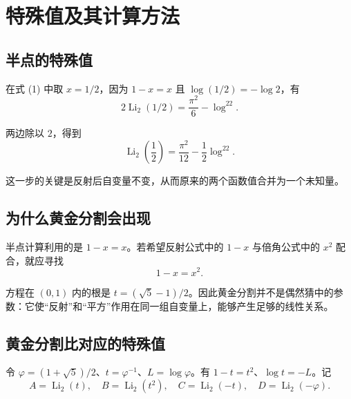 \documentclass[11pt,a4paper]{article}
\begin{document}
\hypertarget{ux7279ux6b8aux503cux53caux5176ux8ba1ux7b97ux65b9ux6cd5}{%
\section{特殊值及其计算方法}\label{ux7279ux6b8aux503cux53caux5176ux8ba1ux7b97ux65b9ux6cd5}}

\hypertarget{ux534aux70b9ux7684ux7279ux6b8aux503c}{%
\subsection{半点的特殊值}\label{ux534aux70b9ux7684ux7279ux6b8aux503c}}

在式 (1) 中取 \(x=1/2\)，因为 \(1-x=x\) 且 \(\log(1/2)=-\log2\)，有
\[
2\operatorname{Li}_2(1/2)=\frac{\pi^2}{6}-\log^22.
\]

两边除以 \(2\)，得到
\begin{equation}
\operatorname{Li}_2\!\left(\frac12\right)
=\frac{\pi^2}{12}-\frac12\log^22.
\tag{5}
\end{equation}

这一步的关键是反射后自变量不变，从而原来的两个函数值合并为一个未知量。

\hypertarget{ux4e3aux4ec0ux4e48ux9ec4ux91d1ux5206ux5272ux4f1aux51faux73b0}{%
\subsection{为什么黄金分割会出现}\label{ux4e3aux4ec0ux4e48ux9ec4ux91d1ux5206ux5272ux4f1aux51faux73b0}}

半点计算利用的是 \(1-x=x\)。若希望反射公式中的 \(1-x\) 与倍角公式中的
\(x^2\) 配合，就应寻找
\[
1-x=x^2.
\]

方程在 \((0,1)\) 内的根是
\(t=(\sqrt5-1)/2\)。因此黄金分割并不是偶然猜中的参数：它使``反射''和``平方''作用在同一组自变量上，能够产生足够的线性关系。

\hypertarget{ux9ec4ux91d1ux5206ux5272ux6bd4ux5bf9ux5e94ux7684ux7279ux6b8aux503c}{%
\subsection{黄金分割比对应的特殊值}\label{ux9ec4ux91d1ux5206ux5272ux6bd4ux5bf9ux5e94ux7684ux7279ux6b8aux503c}}

令 \(\varphi=(1+\sqrt5)/2\)、\(t=\varphi^{-1}\)、\(L=\log\varphi\)。有
\(1-t=t^2\)、\(\log t=-L\)。记
\[
A=\operatorname{Li}_2(t),\quad B=\operatorname{Li}_2(t^2),\quad
C=\operatorname{Li}_2(-t),\quad D=\operatorname{Li}_2(-\varphi).
\]
\end{document}
